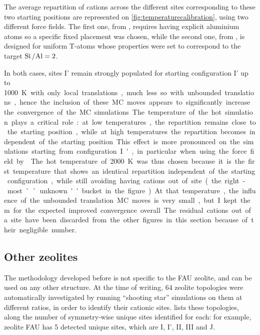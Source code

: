 \documentclass[main.tex]{subfiles}
\begin{document}
The average repartition of cations across the different sites corresponding to these two starting positions are represented on \cref{fig:temperaturecalibration}, using two different force fields. The first one, from \textcite{BoulfelfelSholl2021}, requires having explicit aluminium atoms so a specific fixed placement was chosen, while the second one, from \textcite{DiLellaFF}, is designed for uniform T-atoms whose properties were set to correspond to the target $\mbox{Si\,/Al} = 2$.

In both cases, sites I' remain strongly populated for starting configuration I' up to \qty{1000}K with only local translations, much less so with unbounded translations, hence the inclusion of these MC moves appears to significantly increase the convergence of the MC simulations.

The temperature of the hot simulation plays a critical role: at low temperatures, the repartition remains close to the starting position, while at high temperatures the repartition becomes independent of the starting position. This effect is more pronounced on the simulations starting from configuration I', in particular when using the force field by \textcite{DiLellaFF}. The hot temperature of \qty{2000}K was thus chosen because it is the first temperature that shows an identical repartition independent of the starting configuration, while still avoiding having cations out of site (the right-most ``unknown'' bucket in the figure). At that temperature, the influence of the unbounded translation MC moves is very small, but I kept them for the expected improved convergence overall. The residual cations out of a site have been discarded from the other figures in this section because of their negligible number.


\subsection{Other zeolites}

The methodology developed before is not specific to the FAU zeolite, and can be used on any other structure. At the time of writing, 64 zeolite topologies were automatically investigated by running ``shooting star'' simulations on them at different \SiAl ratios, in order to identify their cationic sites.  lists these topologies, along the number of symmetry-wise unique sites identified for each: for example, zeolite FAU has 5 detected unique sites, which are I, I', II, III and J.
\end{document}
